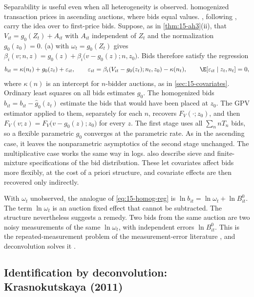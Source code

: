 Separability is useful even when all heterogeneity is observed.  homogenized
transaction prices in ascending auctions, where bids equal values. \citet[Section 6.1.1]{AtheyHaile2007},
following \citet{HaileHongShum2003}, carry the idea over to first-price bids. Suppose, as in
\cref{thm:15-ah3}(ii), that $V_{it}=g_0(Z_t)+A_{it}$ with $A_{it}$ independent of $Z_t$ and the
normalization $g_0(z_0)=0$. (a) with $\omega_t=g_0(Z_t)$ gives
$\beta_i(v;n,z)=g_0(z)+\beta_i\big(v-g_0(z);n,z_0\big)$. Bids therefore satisfy the regression
\begin{equation}\label{eq:15-homog-reg}
b_{it}=\kappa(n_t)+g_0(z_t)+\varepsilon_{it},\qquad
\varepsilon_{it}=\beta_i(V_{it}-g_0(z_t);n_t,z_0)-\kappa(n_t),\qquad \E[\varepsilon_{it}\mid z_t,n_t]=0,
\end{equation}
where $\kappa(n)$ is an intercept for $n$-bidder auctions, as in \cref{sec:15-covariates}. Ordinary least
squares on all bids estimates $g_0$. The homogenized bids $\hat b_{it}=b_{it}-\hat g_0(z_t)$ estimate
the bids that would have been placed at $z_0$. The GPV estimator applied to them, separately for each $n$,
recovers $F_V(\cdot;z_0)$, and then $F_V(v;z)=F_V\big(v-g_0(z);z_0\big)$ for every $z$. The first stage
uses all $\sum_nnT_n$ bids, so a flexible parametric $g_0$ converges at the parametric rate. As in the
ascending case, it leaves the nonparametric asymptotics of the second stage unchanged. The multiplicative
case works the same way in logs. \citet[eqs. (6.7)--(6.9)]{AtheyHaile2007} also describe sieve and finite-mixture
specifications of the bid distribution. These let covariates affect bids more flexibly, at the cost
of a priori structure, and covariate effects are then recovered only indirectly.

With $\omega_t$ unobserved, the analogue of \eqref{eq:15-homog-reg} is
$\ln b_{it}=\ln\omega_t+\ln B^0_{it}$. The term $\ln\omega_t$ is an auction fixed effect that cannot be
subtracted. The structure nevertheless suggests a remedy. Two bids from the same auction are two
noisy measurements of the same $\ln\omega_t$, with independent errors $\ln B^0_{it}$. This is the
repeated-measurement problem of the measurement-error literature \citep{LiVuong1998}, and
deconvolution solves it \citep[Section 6.1.2 and footnote 51]{AtheyHaile2007}.

\subsection{Identification by deconvolution: Krasnokutskaya (2011)}\label{sec:15-krasno}

